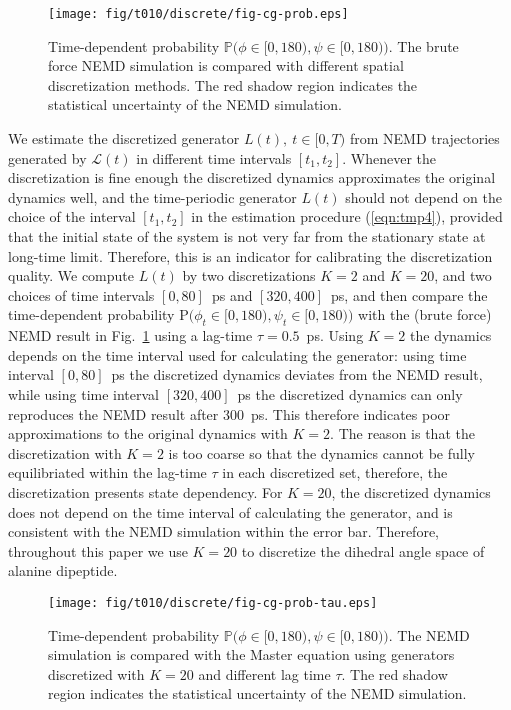\documentclass[aps, pre, preprint,unsortedaddress,a4paper,onecolumn]{revtex4}
\newcommand{\ml}[0]{\mathcal {L}}
\newcommand{\prob}{\textrm{P}}
\begin{document}
\begin{figure}
  \centering
  \texttt{[image: fig/t010/discrete/fig-cg-prob.eps]}  
  \caption{Time-dependent probability $\mathbb
    P\big(\phi\in[0,180), \psi\in [0,180)\big)$.  The brute force NEMD simulation is compared with different
    spatial discretization methods. The red shadow region indicates the
    statistical uncertainty of the NEMD simulation.}
  \label{fig:tmp2}
\end{figure}

We estimate the discretized generator $L(t), \ t\in[0,T)$
from NEMD trajectories generated by $\ml(t)$ in different time intervals $[t_1,
t_2]$.
Whenever the discretization is fine enough the discretized dynamics approximates the original
dynamics well, and the time-periodic generator $L(t)$ should not depend on the choice of the interval $[t_1,t_2]$ in the estimation procedure (\ref{eqn:tmp4}), provided that the initial state of the system
is not very far from the stationary state at long-time limit.
Therefore, this is an indicator for calibrating the discretization quality.
We compute $L(t)$ by two discretizations $K=2$ and $K=20$, and two
choices of time intervals $[0, 80]$~ps and $[320, 400]$~ps, and then
compare the time-dependent probability $\prob\big(\phi_t\in[0,180), \psi_t\in [0,180)\big)$
with the (brute force) NEMD result in Fig.~\ref{fig:tmp2} using a lag-time $\tau=0.5$~ps.
Using $K=2$ the dynamics depends on the time interval used for
calculating the generator: using time interval $[0, 80]$~ps the discretized
dynamics deviates from the NEMD result,
while using time interval $[320, 400]$~ps the discretized dynamics can only
reproduces the NEMD result after 300~ps.  This therefore indicates poor 
approximations to the original dynamics with $K=2$. The reason is that the
discretization with $K=2$ is too coarse so that the dynamics cannot be fully
equilibriated within the lag-time $\tau$ in each discretized set,
therefore, the discretization presents state dependency.  For
$K=20$, the discretized dynamics does not depend on the time interval of
calculating the generator, and is consistent with the
NEMD simulation within the error bar. Therefore, throughout this paper we use $K=20$
to discretize  the dihedral angle space of alanine dipeptide.


\begin{figure}
  \centering
  \texttt{[image: fig/t010/discrete/fig-cg-prob-tau.eps]}  
  \caption{Time-dependent probability $\mathbb
    P\big(\phi\in[0,180), \psi\in [0,180)\big)$.  The NEMD simulation is compared with the Master equation using generators discretized with $K=20$ and different lag time $\tau$. The red shadow region indicates the
    statistical uncertainty of the NEMD simulation.}
  \label{fig:tmp3}
\end{figure}
\end{document}
